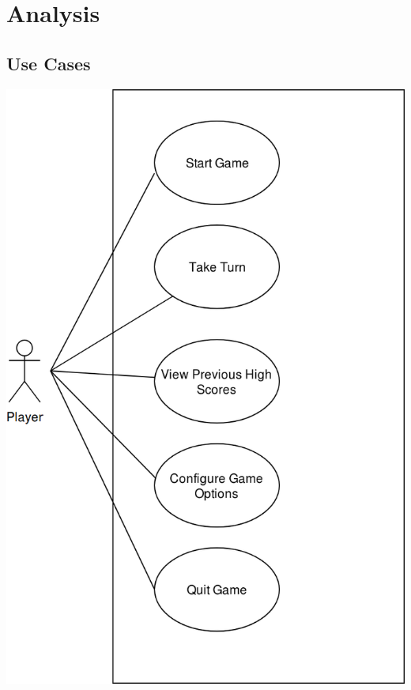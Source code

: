 \documentclass[12pt]{article}
\begin{document}
\section*{Analysis}
\subsection*{Use Cases}
\vspace{.1in}
\hspace{.5in}
\includegraphics[scale=.3]{diagrams/useCase.png}
\end{document}
